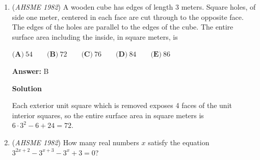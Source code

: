\begin{enumerate}
 
 \begin{align*} y&=2[x]+3 \\ y&=3[x-2]+5. \end{align*}



 If $x$ is not an integer, then $x+y$ is 


 $\textbf{(A) } \ \text{ an integer} \qquad  \textbf{(B) } \ \text{ between 4 and 5} \qquad  \textbf{(C) } \ \text{ between  -4 and 4}\qquad\\ \textbf{(D) } \ \text{ between 15 and 16}\qquad \textbf{(E) } \  16.5$

 \textbf{Answer: }D



\textbf{Solution 1}

We simply ignore the floor of $x$. Then, we have $y$ = $2x + 3$ = $3(x-2)+5$. Solving for $3x - 1 = 2x + 3$, we get $x = 4$. For the floor of $x$, we have $x$ is between $4$ and $5$. Plugging in $8$ + $3$ = $11$ for $y$, we have $y = 11$. We have $11 + 4.x$ = $\boxed {(D)}$




\textbf{Solution 2 (Rigid)}

Since $x$ is not an integer, we let $x=a+b$, where $0<b<1$. 

 So $2[x]+3=2a+3$. $3[x-2]+5=3a-1$.

 $2a+3=3a-1$. $a=4$. So we know that $x$ is between 4 and 5. $y=11$. So $x+y$ is between $15$ and $16$. Select $\boxed{D}$.

 


	\item (\textit{AHSME 1982}) A wooden cube has edges of length $3$ meters. Square holes, of side one meter, centered in each face are cut through to the opposite face. 
The edges of the holes are parallel to the edges of the cube. The entire surface area including the inside, in square meters, is 


 $\textbf {(A)} \ 54 \qquad  \textbf {(B)} \ 72 \qquad  \textbf {(C)} \ 76 \qquad  \textbf {(D)} \ 84\qquad  \textbf {(E)} \ 86$

 \textbf{Answer: }B



\textbf{Solution}

Each exterior unit square which is removed exposes 4 faces of the unit interior squares, so the entire surface area in square meters is $6 \cdot 3^2 - 6 + 24=72.$



	\item (\textit{AHSME 1982}) How many real numbers $x$ satisfy the equation $3^{2x+2}-3^{x+3}-3^{x}+3=0$? 



\end{enumerate}
